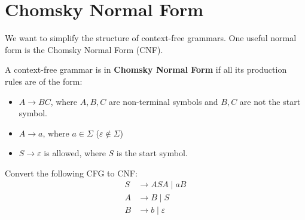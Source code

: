 
\section{Chomsky Normal Form}

We want to simplify the structure of context-free grammars. One useful normal form is the Chomsky Normal Form (CNF).

\begin{definition}
    A context-free grammar is in \textbf{Chomsky Normal Form} if all its production rules are of the form:
    \begin{itemize}
        \item \(A \to BC\), where \(A, B, C\) are non-terminal symbols and \(B, C\) are not the start symbol.
        \item \(A \to a\), where \( a \in \Sigma \) (\( \varepsilon \notin \Sigma \))
        \item \(S \to \varepsilon\) is allowed, where \(S\) is the start symbol.
    \end{itemize}
\end{definition}    

\begin{eg}
    Convert the following CFG to CNF:
    \begin{align*}
        S &\to ASA \mid aB \\
        A &\to B \mid S \\
        B &\to b \mid \varepsilon
    \end{align*}
\end{eg}

